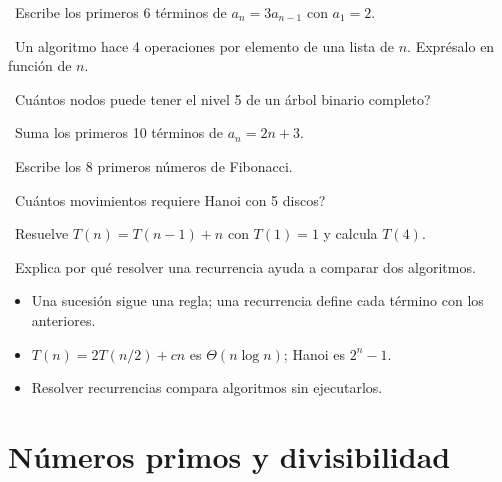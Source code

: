 \begin{tmejercicios}
\label{ej:2-3}
\begin{tmlista}
\item \tmbasico\ Escribe los primeros 6 t\'erminos de $a_n=3a_{n-1}$ con $a_1=2$.
\item \tmbasico\ Un algoritmo hace 4 operaciones por elemento de una lista de $n$. Expr\'esalo en funci\'on de $n$.
\item \tmbasico\ \textquestiondown Cu\'antos nodos puede tener el nivel 5 de un \'arbol binario completo?
\item \tmmedio\ Suma los primeros 10 t\'erminos de $a_n=2n+3$.
\item \tmmedio\ Escribe los 8 primeros n\'umeros de Fibonacci.
\item \tmmedio\ \textquestiondown Cu\'antos movimientos requiere Hanoi con 5 discos?
\item \tmdificil\ Resuelve $T(n)=T(n-1)+n$ con $T(1)=1$ y calcula $T(4)$.
\item \tmdificil\ Explica por qu\'e resolver una recurrencia ayuda a comparar dos algoritmos.
\end{tmlista}
\end{tmejercicios}


\begin{tmresumen}
\begin{itemize}
\item Una sucesi\'on sigue una regla; una recurrencia define cada t\'ermino con los anteriores.
\item $T(n)=2T(n/2)+cn$ es $\Theta(n\log n)$; Hanoi es $2^n-1$.
\item Resolver recurrencias compara algoritmos sin ejecutarlos.
\end{itemize}
\end{tmresumen}

\section{N\'umeros primos y divisibilidad}
\label{sec:2-4}

